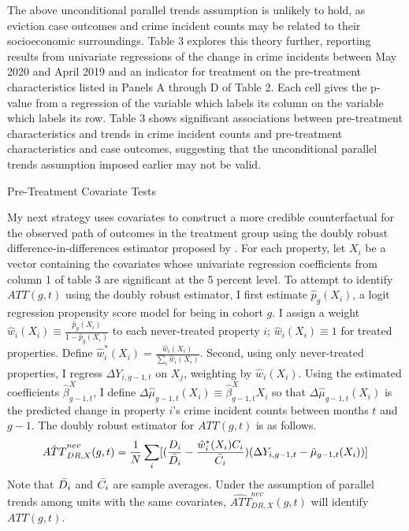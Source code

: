 \documentclass[12pt]{article}
\begin{document}
    The above unconditional parallel trends assumption is unlikely to hold, as eviction case outcomes and crime incident counts may be related to their socioeconomic surroundings. Table 3 explores this theory further, reporting results from univariate regressions of the change in crime incidents between May 2020 and April 2019 and an indicator for treatment on the pre-treatment characteristics listed in Panels A through D of Table 2. Each cell gives the p-value from a regression of the variable which labels its column on the variable which labels its row. Table 3 shows significant associations between pre-treatment characteristics and trends in crime incident counts and pre-treatment characteristics and case outcomes, suggesting that the unconditional parallel trends assumption imposed earlier may not be valid.

\begin{landscape}
    \thispagestyle{empty} 
    \begin{table}[H]
        \centering
        
        \caption{Pre-Treatment Covariate Tests}
        \label{tab:my_label}
    \end{table}
\restoregeometry
    \end{landscape}


    My next strategy uses covariates to construct a more credible counterfactual for the observed path of outcomes in the treatment group using the doubly robust difference-in-differences estimator proposed by \cite{santanna_doubly_2018}. For each property, let $X_i$ be a vector containing the covariates whose univariate regression coefficients from column 1 of table 3 are significant at the 5 percent level. To attempt to identify $ATT(g, t)$ using the doubly robust estimator, I first estimate $\hat{p}_g(X_i)$, a logit regression propensity score model for being in cohort $g$. I assign a weight $\hat{w}_i(X_i) \equiv\frac{\hat{p}_g(X_i)}{1 - \hat{p}_g(X_i)}$ to each never-treated property $i$; $\hat{w}_i(X_i) \equiv 1$ for treated properties. Define $\hat{w}^*_i(X_i) = \frac{\hat{w}_i(X_i)}{\sum_i \hat{w}_i(X_i)}$. Second, using only never-treated properties, I regress $\Delta Y_{i, g-1, t}$ on $X_j$, weighting by $\hat{w}_i(X_i)$. Using the estimated coefficients $\hat{\beta}_{g-1, t}^{X}$, I define $\Delta \hat{\mu}_{g-1, t}(X_i) \equiv \hat{\beta}_{g-1, t}^{X}X_i$ so that $\Delta \hat{\mu}_{g-1, t}(X_i)$ is the predicted change in property $i$'s crime incident counts between months $t$ and $g-1$.
    The doubly robust estimator for $ATT(g, t)$ is as follows.
    \begin{align}
        \hat{ATT}^{nev}_{DR, X}(g,t) = \frac{1}{N}\sum_i[(\frac{D_i}{\Bar{D_i}} - \frac{\hat{w}^*_i(X_i)C_i}{\Bar{C_i}})(\Delta Y_{i, g-1, t} - \hat{\mu}_{g-1, t}(X_i))]
    \end{align}
    Note that $\Bar{D_i}$ and $\Bar{C_i}$ are sample averages. Under the assumption of parallel trends among units with the same covariates, $\hat{ATT}^{nev}_{DR, X}(g,t)$ will identify $ATT(g, t)$.
    
\end{document}

